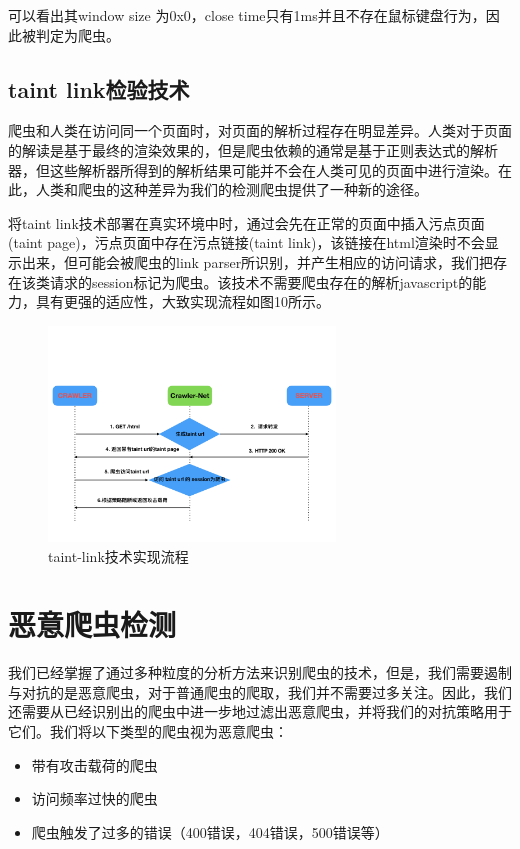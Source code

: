 \documentclass[doctor,privacy,twoside]{buaa_mac}
\begin{document}
可以看出其window size 为0x0，close time只有1ms并且不存在鼠标键盘行为，因此被判定为爬虫。


\subsection{taint link检验技术}
爬虫和人类在访问同一个页面时，对页面的解析过程存在明显差异。人类对于页面的解读是基于最终的渲染效果的，但是爬虫依赖的通常是基于正则表达式的解析器，但这些解析器所得到的解析结果可能并不会在人类可见的页面中进行渲染。在此，人类和爬虫的这种差异为我们的检测爬虫提供了一种新的途径。

将taint link技术部署在真实环境中时，通过会先在正常的页面中插入污点页面(taint page)，污点页面中存在污点链接(taint link)，该链接在html渲染时不会显示出来，但可能会被爬虫的link parser所识别，并产生相应的访问请求，我们把存在该类请求的session标记为爬虫。该技术不需要爬虫存在的解析javascript的能力，具有更强的适应性，大致实现流程如图10所示。


\begin{figure}[!h]
  \centering
  \includegraphics[width=0.68\textwidth]{images/taint_link.png}
  \caption{taint-link技术实现流程}
  \label{fig:logo}
\end{figure}
\centerline{}


\section{恶意爬虫检测}

我们已经掌握了通过多种粒度的分析方法来识别爬虫的技术，但是，我们需要遏制与对抗的是恶意爬虫，对于普通爬虫的爬取，我们并不需要过多关注。因此，我们还需要从已经识别出的爬虫中进一步地过滤出恶意爬虫，并将我们的对抗策略用于它们。我们将以下类型的爬虫视为恶意爬虫：
\begin{itemize}
\item 带有攻击载荷的爬虫
\item 访问频率过快的爬虫
\item 爬虫触发了过多的错误（400错误，404错误，500错误等）
\end{itemize}
\end{document}
